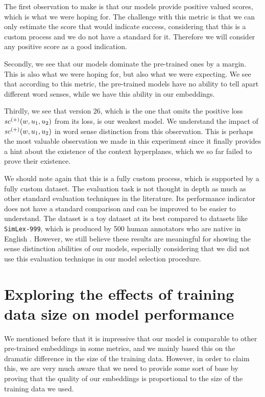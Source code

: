 The first observation to make is that our models provide positive valued scores, which is what we were hoping for. The challenge with this metric is that we can only estimate the score that would indicate success, considering that this is a custom process and we do not have a standard for it. Therefore we will consider any positive score as a good indication. 

Secondly, we see that our models dominate the pre-trained ones by a margin. This is also what we were hoping for, but also what we were expecting. We see that according to this metric, the pre-trained models have no ability to tell apart different word senses, while we have this ability in our embeddings.

Thirdly, we see that version 26, which is the one that omits the positive loss $\mathit{sc}^{({+})}({w, u_1, u_2})$ from its loss, is our weakest model. We understand the impact of $\mathit{sc}^{({+})}({w, u_1, u_2})$ in word sense distinction from this observation. This is perhaps the most valuable observation we made in this experiment since it finally provides a hint about the existence of the context hyperplanes, which we so far failed to prove their existence.

We should note again that this is a fully custom process, which is supported by a fully custom dataset. The evaluation task is not thought in depth as much as other standard evaluation techniques in the literature. Its performance indicator does not have a standard comparison and can be improved to be easier to understand. The dataset is a toy dataset at its best compared to datasets like \verb|SimLex-999|, which is produced by 500 human annotators who are native in English \cite{simlex}. However, we still believe these results are meaningful for showing the sense distinction abilities of our models, especially considering that we did not use this evaluation technique in our model selection procedure.

\newpage

\section{Exploring the effects of training data size on model performance}
\label{sec:data_size}

We mentioned before that it is impressive that our model is comparable to other pre-trained embeddings in some metrics, and we mainly based this on the dramatic difference in the size of the training data. However, in order to claim this, we are very much aware that we need to provide some sort of base by proving that the quality of our embeddings is proportional to the size of the training data we used. 


